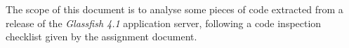 The scope of this document is to analyse some pieces of code extracted from a release of the \textit{Glassfish 4.1} application server, following a code inspection checklist given by the assignment document.